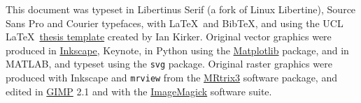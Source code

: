 \documentclass[12pt,phd,a4paper,twoside]{ucl_thesis}
\begin{document}
This document was typeset in Libertinus Serif (a fork of Linux Libertine), {\sffamily Source Sans Pro} and {\ttfamily Courier} typefaces, with \LaTeX\ and Bib\TeX, and using the UCL \LaTeX\ \href{https://github.com/UCL/ucl-latex-thesis-templates}{thesis template} created by Ian Kirker.
Original vector graphics were produced in \href{https://inkscape.org/}{Inkscape}, Keynote, in Python using the \href{https://matplotlib.org/}{Matplotlib} package, and in MATLAB, and typeset using the \verb|svg| package.
Original raster graphics were produced with Inkscape and \verb|mrview| from the \href{https://www.mrtrix.org/}{MRtrix3} software package, and edited in \href{https://www.gimp.org/}{GIMP} 2.1 and with the \href{https://imagemagick.org/index.php}{ImageMagick} software suite.

\end{document}
